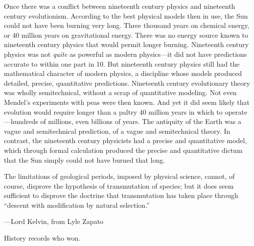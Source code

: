 {
 Once there was a conflict between nineteenth century physics and
nineteenth century evolutionism. According to the best physical models
then in use, the Sun could not have been burning very long. Three
thousand years on chemical energy, or 40 million years on gravitational
energy. There was no energy source known to nineteenth century physics
that would permit longer burning. Nineteenth century physics was not
\textit{quite} as powerful as modern physics---it did not have
predictions accurate to within one part in 10. But
nineteenth century physics still had the mathematical character of
modern physics, a discipline whose models produced detailed, precise,
quantitative predictions. Nineteenth century evolutionary theory was
wholly semitechnical, without a scrap of quantitative modeling. Not
even Mendel's experiments with peas were then known.
And yet it did seem likely that evolution would require longer than a
paltry 40 million years in which to operate---hundreds of millions,
even billions of years. The antiquity of the Earth was a vague and
semitechnical prediction, of a vague and semitechnical theory. In
contrast, the nineteenth century physicists had a precise and
quantitative model, which through formal calculation produced the
precise and quantitative dictum that the Sun simply could not have
burned that long.}

{
 The limitations of geological periods, imposed by physical
science, cannot, of course, disprove the hypothesis of transmutation of
species; but it does seem sufficient to disprove the doctrine that
transmutation has taken place through ``descent with
modification by natural selection.''}

{\raggedleft
 {}---Lord Kelvin, from Lyle Zapato
\par}


\bigskip

{
 History records who won.}


